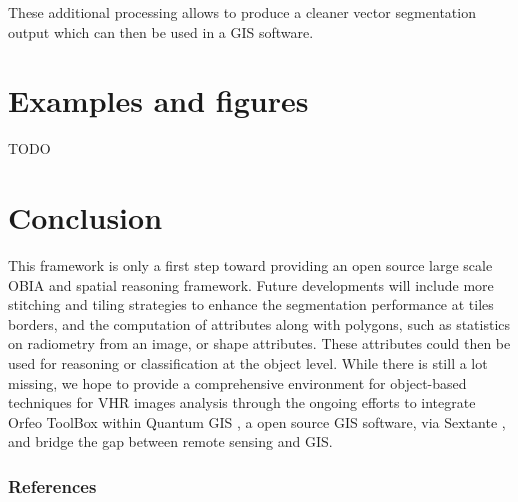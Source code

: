 \documentclass{josis}
\begin{document}
These additional processing allows to produce a cleaner vector
segmentation output which can then be used in a GIS software.


\section{Examples and figures}

TODO

\section{Conclusion}

  This framework is only a first step toward providing an open source
 large scale OBIA and spatial reasoning framework. Future developments
 will include more stitching and tiling strategies to enhance the
 segmentation performance at tiles borders, and the computation of
 attributes along with polygons, such as statistics on radiometry from
 an image, or shape attributes. These attributes could then be used
 for reasoning or classification at the object level. While there is
 still a lot missing, we hope to provide a comprehensive environment
 for object-based techniques for VHR images analysis through the
 ongoing efforts to integrate Orfeo ToolBox within Quantum
 GIS \cite{}, a open source GIS software, via Sextante \cite{},
 and bridge the gap between remote sensing and GIS.


\subsubsection{References}



\end{document}
